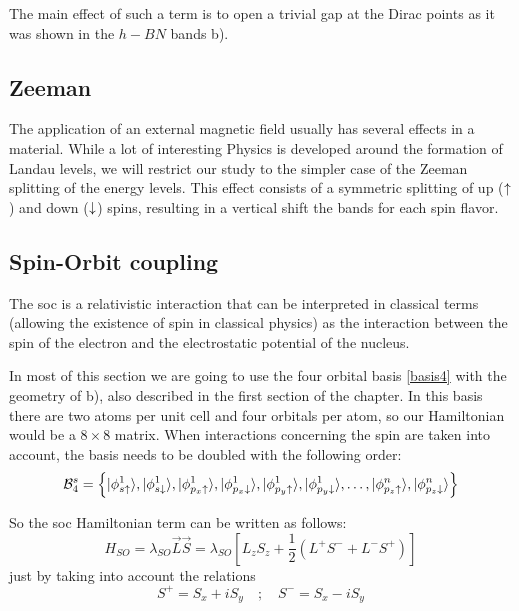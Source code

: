 The main effect of such a term is to open a trivial gap at the Dirac points as it was shown in the $h-BN$ bands b).

\subsection{Zeeman}
The application of an external magnetic field usually has several effects in a material. While a lot of interesting Physics is developed around the formation of Landau levels\cite{}, %
 we will restrict our study to the simpler case of the Zeeman splitting of the energy levels. This effect consists of a symmetric splitting of up ($\uparrow$) and down ($\downarrow$) spins, resulting in a vertical shift the bands for each spin flavor. %

\subsection{Spin-Orbit coupling}
\label{sec:soc}
The \acf{soc} is a relativistic interaction that can be interpreted in classical terms (allowing the existence of spin in classical physics) as the interaction between the spin of the electron and the electrostatic potential of the nucleus.

In most of this section we are going to use the four orbital basis \eqref{basis4} with the geometry of b), also described in the first section of the chapter.
In this basis there are two atoms per unit cell and four orbitals per atom, so our Hamiltonian would be a $8\times8$ matrix. When interactions concerning the spin are taken into account, the basis needs to be doubled with the following order:
\begin{equation}
  \mathcal{B}^{s}_4 = \left\{
  |\phi^1_{s\uparrow}\rangle,
  |\phi^1_{s\downarrow}\rangle,
  |\phi^1_{p_x\uparrow}\rangle,
  |\phi^1_{p_x\downarrow}\rangle,
  |\phi^1_{p_y\uparrow}\rangle,
  |\phi^1_{p_y\downarrow}\rangle,
  \dots,
  |\phi^n_{p_z\uparrow}\rangle,
  |\phi^n_{p_z\downarrow}\rangle
  \right\}
\label{basis4spin}
\end{equation}

So the \ac{soc} Hamiltonian term can be written as follows:
\begin{equation}
   H_{SO}= \lambda_{SO}\vec{L}\vec{S} =
   \lambda_{SO}\left[L_zS_z+
   \frac{1}{2}\left(L^{+}S^{-}+L^{-}S^{+}\right)\right]
\label{soc}
\end{equation}
just by taking into account the relations
\begin{equation*}
   S^{+} = S_x + iS_y \quad;\quad
   S^{-} = S_x - iS_y
\end{equation*}

